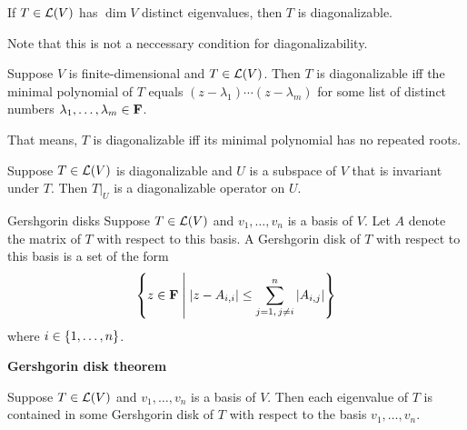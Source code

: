 \documentclass[12pt,a4paper]{article}
\begin{document}
    \begin{prop}
        If $T\in\mathcal{L}(V)$ has $\dim V$ distinct eigenvalues, then $T$ is diagonalizable.
    \end{prop}
    \begin{remark}
        Note that this is not a neccessary condition for diagonalizability.
    \end{remark}
    \hfill

    \begin{prop}
        Suppose $V$ is finite-dimensional and $T\in\mathcal{L}(V)$. Then $T$ is diagonalizable iff the minimal polynomial of $T$ equals $(z-\lambda_1)\cdots(z-\lambda_m)$ for some list of distinct numbers $\lambda_1,\dots,\lambda_m\in\mathbf{F}$.
    \end{prop}
    \begin{remark}
        That means, $T$ is diagonalizable iff its minimal polynomial has no repeated roots.
    \end{remark}
    \begin{cor}
        Suppose $T\in\mathcal{L}(V)$ is diagonalizable and $U$ is a subspace of $V$ that is invariant under $T$. Then $T|_U$ is a diagonalizable operator on $U$.
    \end{cor}
    \hfill

    \begin{defi}{Gershgorin disks}
        Suppose $T\in\mathcal{L}(V)$ and $v_1,\dots,v_n$ is a basis of $V$. Let $A$ denote the matrix of $T$ with respect to this basis. A Gershgorin disk of $T$ with respect to this basis is a set of the form
        $$
        \left\{z\in\mathbf{F}\;\middle|\;\left\lvert z-A_{i,i}\right\rvert\leq \sum_{{j=1,\,j\neq i}}^n \left\lvert A_{i,j}\right\rvert\right\}
        $$
        where $i\in\left\{1,\dots,n\right\}$.
    \end{defi}
    \hfill

    \begin{thm}
        \textbf{Gershgorin disk theorem}
        
        Suppose $T\in\mathcal{L}(V)$ and $v_1,\dots,v_n$ is a basis of $V$. Then each eigenvalue of $T$ is contained in some Gershgorin disk of $T$ with respect to the basis $v_1,\dots,v_n$.
    \end{thm}
\end{document}

